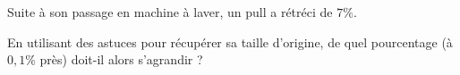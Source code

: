 \begin{exo}{}
	Suite à son passage en machine à laver, un pull a rétréci de $7\%$.


	En utilisant des astuces pour récupérer sa taille d'origine, de quel pourcentage (à $0,1$\% près) doit-il alors s'agrandir ?
\end{exo}
